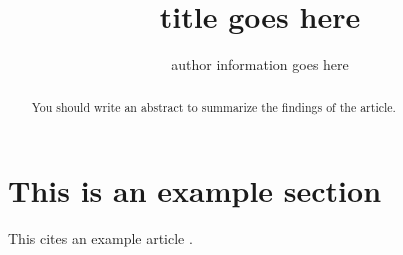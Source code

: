 \documentclass[10pt,a4paper]{article}
\title{title goes here}
\author{author information goes here}
\begin{document}
\maketitle
\begin{abstract}
You should write an abstract to summarize the findings of the article.
\end{abstract}
\section{This is an example section}
This cites an example article \cite{example_article}.


\end{document}
